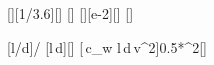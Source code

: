 [\kmph][1/3.6][\mps]
[\m]
[\cm][e-2][\m]
[\kilo\gram\per\cubic\meter]

[l/d]{\lFaX/\dFaX}
[l\,d]{\lFaX*\dFaX}[\m\squared]
[\,c_w\,\rho\,l\,d\,v^2]{0.5*\cwZX*\rhLX*\lFaX*\dFaX*\vWiX^2}[\N]
